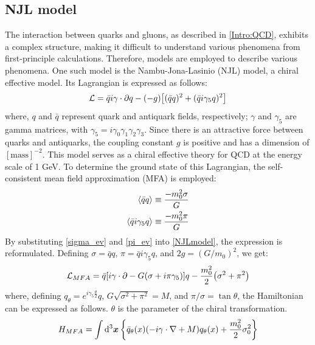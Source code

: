     \subsection{NJL model}
    \label{NJL model}      
        The interaction between quarks and gluons, as described in \ref{Intro:QCD}, exhibits a complex structure, making it difficult to understand various phenomena from first-principle calculations. Therefore, models are employed to describe various phenomena. One such model is the Nambu-Jona-Lasinio (NJL) model, a chiral effective model. Its Lagrangian is expressed as follows: 
        \begin{eqnarray}
            \label{NJLmodel}
            \mathcal{L}=\bar{q}i\gamma \cdot \partial q -(-g)\qty[(\bar{q}q)^2+(\bar{q}i\gamma_5q)^2]
        \end{eqnarray}  
        where, $q$ and $\bar{q}$ represent quark and antiquark fields, respectively; $\gamma$ and $\gamma_5$ are gamma matrices, with $\gamma_5 = i \gamma_0 \gamma_1 \gamma_2 \gamma_3$. Since there is an attractive force between quarks and antiquarks, the coupling constant $g$ is positive and has a dimension of $[\text{mass}]^{-2}$.  
        This model serves as a chiral effective theory for QCD at the energy scale of 1 GeV. To determine the ground state of this Lagrangian, the self-consistent mean field approximation (MFA) is employed:  
        \begin{eqnarray}
            \label{sigma_ev}
            \ev{\bar{q}q}\equiv \frac{-m_0^2 \sigma}{G}\\
            \label{pi_ev}
            \ev{\bar{q}i\gamma_5q}\equiv \frac{-m_0^2 \pi}{G}
        \end{eqnarray}
        By substituting \eqref{sigma_ev} and \eqref{pi_ev} into \eqref{NJLmodel}, the expression is reformulated. Defining $\sigma = \bar{q}q$, $\pi = \bar{q} i \gamma_5 q$, and $2g = (G/m_0)^2$, we get:  
        \begin{eqnarray}
            \label{heikinbago}
            \mathcal{L}_{MFA} = \bar{q}\qty[i \gamma \cdot \partial - G(\sigma + i \pi \gamma_5)]q-\frac{m_0^2}{2}\qty(\sigma^2+\pi^2)
        \end{eqnarray}
        where, defining $q_\theta = e^{i \gamma_5 \frac{\theta}{2}} q$, $G \sqrt{\sigma^2 + \pi^2} = M$, and $\pi / \sigma = \tan{\theta}$, the Hamiltonian can be expressed as follows. $\theta$ is the parameter of the chiral transformation.  
        \begin{eqnarray}
            \label{ham}
            H_{MFA}=\int \dd[3]{\bm{x}}\qty{\bar{q}_\theta (x)(-i\gamma \cdot \nabla+M)q_{\theta}(x)+\frac{m_0^2}{2}\sigma_0^2}
        \end{eqnarray}
